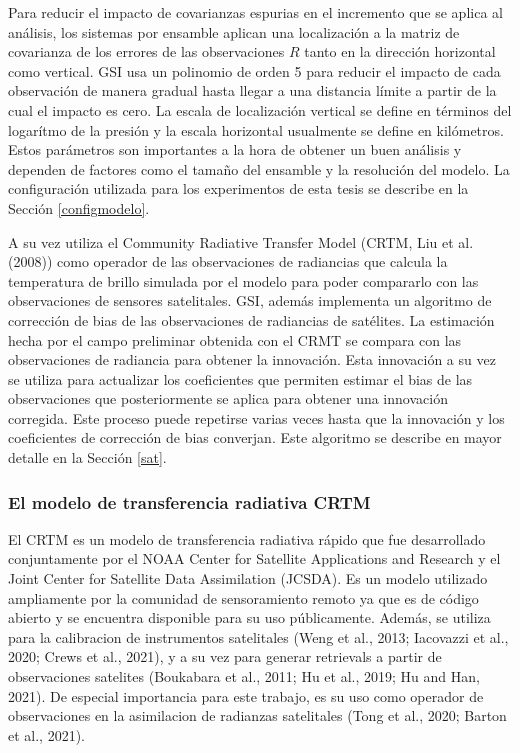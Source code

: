 \documentclass[12pt,oneside,a4paper]{reedthesis}
\begin{document}
Para reducir el impacto de covarianzas espurias en el incremento que se aplica al análisis, los sistemas por ensamble aplican una localización a la matriz de covarianza de los errores de las observaciones \(R\) tanto en la dirección horizontal como vertical.
GSI usa un polinomio de orden 5 para reducir el impacto de cada observación de manera gradual hasta llegar a una distancia límite a partir de la cual el impacto es cero. La escala de localización vertical se define en términos del logarítmo de la presión y la escala horizontal usualmente se define en kilómetros.
Estos parámetros son importantes a la hora de obtener un buen análisis y dependen de factores como el tamaño del ensamble y la resolución del modelo. La configuración utilizada para los experimentos de esta tesis se describe en la Sección \ref{configmodelo}.

A su vez utiliza el Community Radiative Transfer Model (CRTM, Liu et al. (2008)) como operador de las observaciones de radiancias que calcula la temperatura de brillo simulada por el modelo para poder compararlo con las observaciones de sensores satelitales.
GSI, además implementa un algoritmo de corrección de bias de las observaciones de radiancias de satélites.
La estimación hecha por el campo preliminar obtenida con el CRMT se compara con las observaciones de radiancia para obtener la innovación.
Esta innovación a su vez se utiliza para actualizar los coeficientes que permiten estimar el bias de las observaciones que posteriormente se aplica para obtener una innovación corregida. Este proceso puede repetirse varias veces hasta que la innovación y los coeficientes de corrección de bias converjan.
Este algoritmo se describe en mayor detalle en la Sección \ref{sat}.

\hypertarget{el-modelo-de-transferencia-radiativa-crtm}{%
\subsubsection{El modelo de transferencia radiativa CRTM}\label{el-modelo-de-transferencia-radiativa-crtm}}

El CRTM es un modelo de transferencia radiativa rápido que fue desarrollado conjuntamente por el NOAA Center for Satellite Applications and Research y el Joint Center for Satellite Data Assimilation (JCSDA). Es un modelo utilizado ampliamente por la comunidad de sensoramiento remoto ya que es de código abierto y se encuentra disponible para su uso públicamente. Además, se utiliza para la calibracion de instrumentos satelitales (Weng et al., 2013; Iacovazzi et al., 2020; Crews et al., 2021), y a su vez para generar retrievals a partir de observaciones satelites (Boukabara et al., 2011; Hu et al., 2019; Hu and Han, 2021). De especial importancia para este trabajo, es su uso como operador de observaciones en la asimilacion de radianzas satelitales (Tong et al., 2020; Barton et al., 2021).
\end{document}
